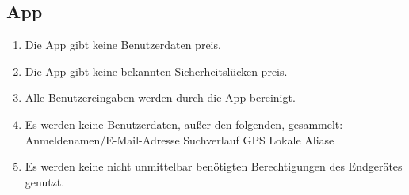 \subsection{App}

\begin{enumerate}
    \item Die App gibt keine Benutzerdaten preis.
    \item Die App gibt keine bekannten Sicherheitslücken preis.
    \item Alle Benutzereingaben werden durch die App bereinigt.
    \item Es werden keine Benutzerdaten, außer den folgenden, gesammelt:
        \subitem Anmeldenamen/E-Mail-Adresse
        \subitem Suchverlauf
        \subitem GPS
        \subitem Lokale Aliase
    \item Es werden keine nicht unmittelbar benötigten Berechtigungen des Endgerätes genutzt.
\end{enumerate}